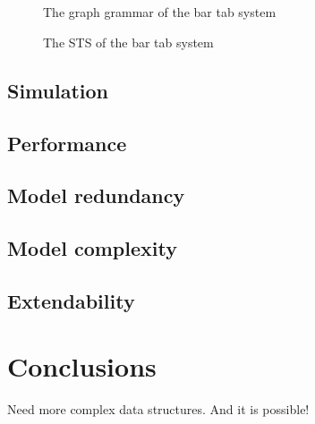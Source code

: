 \begin{figure}[ht]
  \begin{center}
    \\
    \hspace{20px}
    \\
    \hspace{20px}
  \end{center}
  \caption{The graph grammar of the bar tab system}
  \label{fig:gg-bartab}
\end{figure}

\begin{figure}[ht]
  \begin{center}
  \end{center}
  \caption{The STS of the bar tab system}
  \label{fig:sts-bartab}
\end{figure}

\subsection{Simulation}


\subsection{Performance}


\subsection{Model redundancy}


\subsection{Model complexity}


\subsection{Extendability}


\begin{comment}
\section{Example 5: communication protocol}
\end{comment}


\section{Conclusions}
Need more complex data structures. And it is possible!
